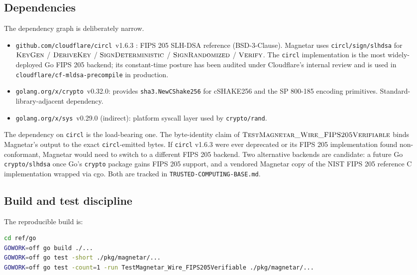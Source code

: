 \subsection{Dependencies}
\label{sec:impl:deps}

The dependency graph is deliberately narrow.

\begin{itemize}[leftmargin=2em,nosep]
  \item \texttt{github.com/cloudflare/circl}~v1.6.3 \cite{circl}:
        FIPS 205 SLH-DSA reference (BSD-3-Clause). Magnetar uses
        \texttt{circl/sign/slhdsa} for
        $\textsc{KeyGen}$ / $\textsc{DeriveKey}$ /
        $\textsc{SignDeterministic}$ / $\textsc{SignRandomized}$ /
        $\textsc{Verify}$. The \texttt{circl} implementation is the
        most widely-deployed Go FIPS 205 backend; its constant-time
        posture has been audited under Cloudflare's internal review
        and is used in \texttt{cloudflare/cf-mldsa-precompile} in
        production.
  \item \texttt{golang.org/x/crypto}~v0.32.0: provides
        \texttt{sha3.NewCShake256} for cSHAKE256 and the SP 800-185
        encoding primitives. Standard-library-adjacent dependency.
  \item \texttt{golang.org/x/sys}~v0.29.0 (indirect): platform
        syscall layer used by \texttt{crypto/rand}.
\end{itemize}

The dependency on \texttt{circl} is the load-bearing one. The
byte-identity claim of
$\textsc{TestMagnetar\_Wire\_FIPS205Verifiable}$ binds Magnetar's
output to the exact \texttt{circl}-emitted bytes. If \texttt{circl}
v1.6.3 were ever deprecated or its FIPS 205 implementation found
non-conformant, Magnetar would need to switch to a different FIPS 205
backend. Two alternative backends are candidate: a future Go
\texttt{crypto/slhdsa} once Go's \texttt{crypto} package gains FIPS
205 support, and a vendored Magnetar copy of the NIST FIPS 205
reference C implementation wrapped via cgo. Both are tracked in
\texttt{TRUSTED-COMPUTING-BASE.md}.

\subsection{Build and test discipline}
\label{sec:impl:build}

The reproducible build is:
\begin{lstlisting}[language=bash,caption={Magnetar reproducible build.}]
cd ref/go
GOWORK=off go build ./...
GOWORK=off go test -short ./pkg/magnetar/...
GOWORK=off go test -count=1 -run TestMagnetar_Wire_FIPS205Verifiable ./pkg/magnetar/...
\end{lstlisting}

